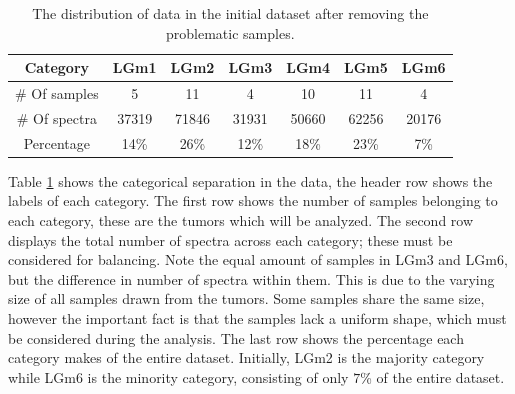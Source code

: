 \begin{table}[htb]
\centering
 \begin{tabular}{||c c c c c c c||} 
 \hline
 Category & LGm1 & LGm2 & LGm3 & LGm4 & LGm5 & LGm6 \\ [0.5ex] 
 \hline\hline
 \# Of samples & 5& 11 & 4 & 10 & 11 & 4 \\ 
 \hline
 \# Of spectra & 37319 & 71846 & 31931 & 50660 & 62256 & 20176 \\
 \hline
 Percentage & 14\%& 26\% & 12\% & 18\% & 23\% & 7\% \\
 \hline

\end{tabular}
\caption{The distribution of data in the initial dataset after removing the problematic samples.}
\label{table:1}
\end{table}

Table \ref{table:1} shows the categorical separation in the data, the header row shows the labels of each category. The first row shows the number of samples belonging to each category, these are the tumors which will be analyzed. The second row displays the total number of spectra across each category; these must be considered for balancing. Note the equal amount of samples in LGm3 and LGm6, but the difference in number of spectra within them. This is due to the varying size of all samples drawn from the tumors. Some samples share the same size, however the important fact is that the samples lack a uniform shape, which must be considered during the analysis. The last row shows the percentage each category makes of the entire dataset. Initially, LGm2 is the majority category while LGm6 is the minority category, consisting of only $7$\% of the entire dataset.

